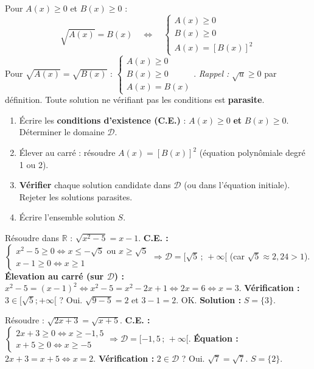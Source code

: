 \documentclass[11pt]{article}
\begin{document}
\begin{propriete}
Pour $A(x)\geq 0$ et $B(x)\geq 0$ :
\[\sqrt{A(x)}=B(x) \quad\Longleftrightarrow\quad \begin{cases} A(x)\geq 0 \\ B(x)\geq 0 \\ A(x)=[B(x)]^2 \end{cases}\]
Pour $\sqrt{A(x)}=\sqrt{B(x)}$ : $\begin{cases} A(x)\geq 0 \\ B(x)\geq 0 \\ A(x)=B(x) \end{cases}$.
\emph{Rappel :} $\sqrt{u}\geq 0$ par définition. Toute solution ne vérifiant pas les conditions est \textbf{parasite}.
\end{propriete}

\begin{methode}[Résoudre $\sqrt{A(x)}=B(x)$]
\begin{enumerate}
\item Écrire les \textbf{conditions d'existence (C.E.)} : $A(x)\geq 0$ \textbf{et} $B(x)\geq 0$. Déterminer le domaine $\mathcal{D}$.
\item Élever au carré : résoudre $A(x)=[B(x)]^2$ (équation polynômiale degré 1 ou 2).
\item \textbf{Vérifier} chaque solution candidate dans $\mathcal{D}$ (ou dans l'équation initiale). Rejeter les solutions parasites.
\item Écrire l'ensemble solution $S$.
\end{enumerate}
\end{methode}

\begin{exoresolu}
Résoudre dans $\mathbb{R}$ : $\sqrt{x^2-5}=x-1$.
\tcblower
\textbf{C.E. :} $\begin{cases} x^2-5\geq 0 \iff x\leq -\sqrt{5} \text{ ou } x\geq \sqrt{5} \\ x-1\geq 0 \iff x\geq 1 \end{cases} \Rightarrow \mathcal{D}=[\sqrt{5}\,;\,+\infty[$ (car $\sqrt{5}\approx 2,24 > 1$).
\textbf{Élevation au carré (sur $\mathcal{D}$) :} $x^2-5=(x-1)^2 \iff x^2-5=x^2-2x+1 \iff 2x=6 \iff x=3$.
\textbf{Vérification :} $3\in[\sqrt{5};+\infty[$ ? Oui. $\sqrt{9-5}=2$ et $3-1=2$. OK.
\textbf{Solution :} $S=\{3\}$.
\end{exoresolu}

\begin{exoresolu}[Équation $\sqrt{A}=\sqrt{B}$]
Résoudre : $\sqrt{2x+3}=\sqrt{x+5}$.
\tcblower
\textbf{C.E. :} $\begin{cases} 2x+3\geq 0 \iff x\geq -1,5 \\ x+5\geq 0 \iff x\geq -5 \end{cases} \Rightarrow \mathcal{D}=[-1,5\,;\,+\infty[$.
\textbf{Équation :} $2x+3=x+5 \iff x=2$.
\textbf{Vérification :} $2\in\mathcal{D}$ ? Oui. $\sqrt{7}=\sqrt{7}$.
$S=\{2\}$.
\end{exoresolu}
\end{document}
